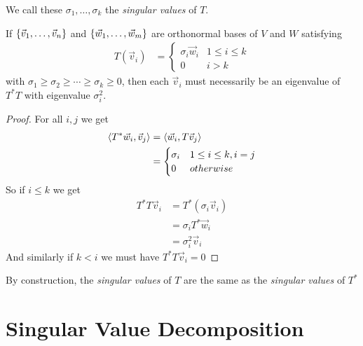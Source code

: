 \begin{definition}
  We call these $\sigma_1,\ldots,\sigma_k$ the \emph{singular values} of $T$.
\end{definition}

\begin{remark}
  If $\left\{\vec v_1,\ldots,\vec v_n\right\}$ and $\left\{\vec w_1,\ldots,\vec w_m\right\}$ are orthonormal bases of $V$ and $W$ satisfying
    \begin{align}
      T(\vec v_i) &= \begin{cases}
        \sigma_i\vec w_i & 1 \le i \le k \\
        0 & i > k
      \end{cases}
    \end{align}
  with $\sigma_1 \ge \sigma_2 \ge \cdots \ge \sigma_k \ge 0$, then each $\vec v_i$ must necessarily be an eigenvalue of $T^*T$ with eigenvalue $\sigma_i^2$.
\end{remark}
\begin{proof}
  For all $i,j$ we get
    \begin{align}
      \left\langle T^*\vec w_i , \vec v_j \right\rangle
        &= \left\langle \vec w_i , T\vec v_j \right\rangle \\
        &= \begin{cases}
          \sigma_i & 1 \le i \le k, i = j \\
          0 & otherwise
        \end{cases}
    \end{align}
  So if $i \le k$ we get
    \begin{align}
      T^*T \vec v_i &= T^*(\sigma_i\vec v_i) \\
        &= \sigma_iT^*\vec w_i \\
        &= \sigma_i^2\vec v_i
    \end{align}
  And similarly if $k < i$ we must have $T^*T \vec v_i = 0$
\end{proof}

\begin{remark}
  By construction, the \emph{singular values} of $T$ are the same as the \emph{singular values} of $T^*$
\end{remark}

\section{Singular Value Decomposition}

